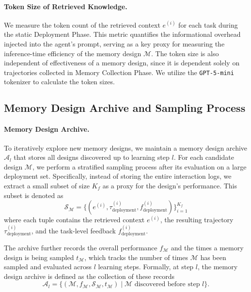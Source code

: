 \documentclass{article}
\theoremstyle{plain}
\theoremstyle{definition}
\theoremstyle{remark}
\begin{document}
\paragraph{Token Size of Retrieved Knowledge.} We measure the token count of the retrieved context $e^{(i)}$ for each task during the static Deployment Phase. This metric quantifies the informational overhead injected into the agent's prompt, serving as a key proxy for measuring the inference-time efficiency of the memory design $\mathcal{M}$. The token size is also independent of effectiveness of a memory design, since it is dependent solely on trajectories collected in Memory Collection Phase. We utilize the \texttt{GPT-5-mini} tokenizer to calculate the token sizes.

\subsection{Memory Design Archive and Sampling Process}
\label{selection_process}
\paragraph{Memory Design Archive.} 
To iteratively explore new memory designs, we maintain a memory design archive $\mathcal{A}_l$ that stores all designs discovered up to learning step $l$. For each candidate design $\mathcal{M}$, we perform a stratified sampling process \citep{thompson2012sampling} after its evaluation on a large deployment set. Specifically, instead of storing the entire interaction logs, we extract a small subset of size $K_f$ as a proxy for the design's performance. This subset is denoted as
\[
\mathcal{S}_{\mathcal{M}} = \{ (e^{(i)}, \tau^{(i)}_{\text{deployment}}, f_{\text{deployment}}^{(i)}) \}_{i=1}^{K_f}
\]
where each tuple contains the retrieved context $e^{(i)}$, the resulting trajectory $\tau^{(i)}_{\text{deployment}}$, and the task-level feedback $f_{\text{deployment}}^{(i)}$. 

The archive further records the overall performance $f_{\mathcal{M}}$ and the times a memory design is being sampled $t_{\mathcal{M}}$, which tracks the number of times $\mathcal{M}$ has been sampled and evaluated across $l$ learning steps. Formally, at step $l$, the memory design archive is defined as the collection of these records
\[
\mathcal{A}_l = \Big\{ (\mathcal{M}, f_{\mathcal{M}}, \mathcal{S}_{\mathcal{M}}, t_{\mathcal{M}}) \;\Big|\; \mathcal{M} \text{ discovered before step } l \Big\}.
\]
\end{document}
